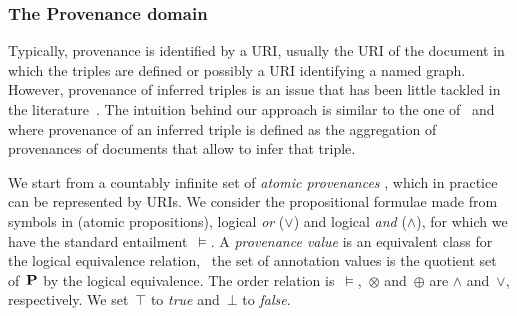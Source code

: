 \subsubsection{The Provenance domain}
\label{sec:provenance-domain}

Typically, provenance is identified by a URI, usually the URI of the document in which the triples are defined or
possibly a URI identifying a named graph. However, provenance of inferred triples is an issue that has been little
tackled in the literature~\cite{DelbruPolleresTummarello:2008aa,FlourisFundulakiPediaditis:2009aa}.
%
The intuition behind our approach is similar to the one of~\citet{DelbruPolleresTummarello:2008aa}
and~\citet{FlourisFundulakiPediaditis:2009aa} where provenance of an inferred triple is defined as the aggregation of
provenances of documents that allow to infer that triple. 


We start from a countably infinite set of \emph{atomic provenances} \AP, which in practice can be represented by
\acp{URI}. We consider the propositional formulae made from symbols in \AP (atomic propositions), logical \textsl{or}
($\lor$) and logical \textsl{and} ($\land$), for which we have the standard entailment~$\models$.
%
A \emph{provenance value} is an equivalent class for the logical equivalence relation, \ie~the set of annotation values
is the quotient set of~$\mathbf{P}$ by the logical equivalence. The order relation is~$\models$,~$\otimes$ and~$\oplus$ are
$\land$ and~$\lor$, respectively. We set~$\top$ to \textsl{true} and~$\bot$ to \textsl{false}.
%

